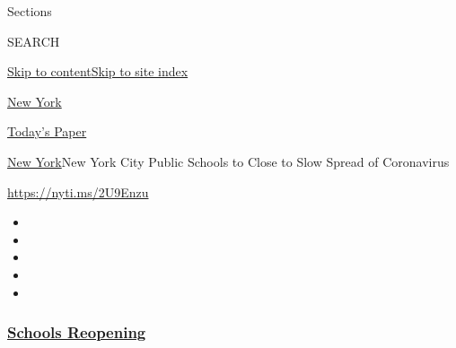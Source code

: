Sections

SEARCH

\protect\hyperlink{site-content}{Skip to
content}\protect\hyperlink{site-index}{Skip to site index}

\href{https://www.nytimes3xbfgragh.onion/section/nyregion}{New York}

\href{https://myaccount.nytimes3xbfgragh.onion/auth/login?response_type=cookie\&client_id=vi}{}

\href{https://www.nytimes3xbfgragh.onion/section/todayspaper}{Today's
Paper}

\href{/section/nyregion}{New York}\textbar{}New York City Public Schools
to Close to Slow Spread of Coronavirus

\url{https://nyti.ms/2U9Enzu}

\begin{itemize}
\item
\item
\item
\item
\item
\end{itemize}

\hypertarget{schools-reopening}{%
\subsubsection{\texorpdfstring{\href{https://www.nytimes3xbfgragh.onion/spotlight/schools-reopening?name=styln-coronavirus-schools-reopening\&region=TOP_BANNER\&variant=undefined\&block=storyline_menu_recirc\&action=click\&pgtype=Article\&impression_id=c12fe170-e108-11ea-860d-f9c39423259e}{Schools
Reopening}}{Schools Reopening}}\label{schools-reopening}}


